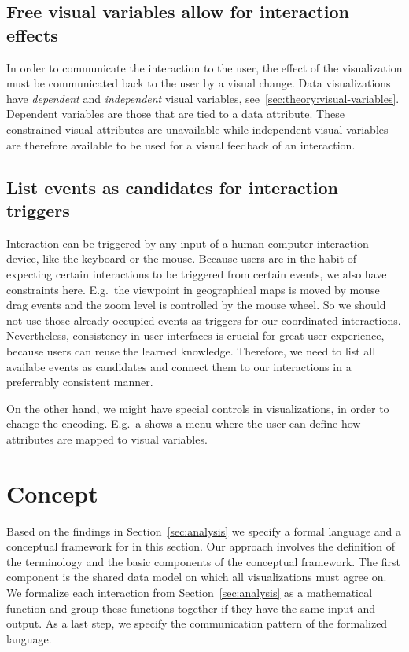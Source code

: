 \begin{bullshit}
\subsection{Free visual variables allow for interaction effects}

In order to communicate the interaction to the user, the effect of the visualization must be communicated back to the user by a visual change.
Data visualizations have \emph{dependent} and \emph{independent} visual variables, see~\ref{sec:theory:visual-variables}.
Dependent variables are those that are tied to a data attribute.
These constrained visual attributes are unavailable while independent visual variables are therefore available to be used for a visual feedback of an interaction.

\subsection{List events as candidates for interaction triggers}

Interaction can be triggered by any input of a human-computer-interaction device, like the keyboard or the mouse.
Because users are in the habit of expecting certain interactions to be triggered from certain events, we also have constraints here.
E.g.\ the viewpoint in geographical maps is moved by mouse drag events and the zoom level is controlled by the mouse wheel.
So we should not use those already occupied events as triggers for our coordinated interactions.
Nevertheless, consistency in user interfaces is crucial for great user experience, because users can reuse the learned knowledge.
Therefore, we need to list all availabe events as candidates and connect them to our interactions in a preferrably consistent manner.

On the other hand, we might have special controls in visualizations, in order to change the encoding.
E.g.\ a \tmap{} shows a menu where the user can define how attributes are mapped to visual variables.
\end{bullshit}


\clearpage
\section{Concept}\label{sec:concept}
Based on the findings in Section~\ref{sec:analysis} we specify a formal language and a conceptual framework for \cmvs{} in this section.
Our approach involves the definition of the terminology and the basic components of the conceptual framework.
The first component is the shared data model on which all visualizations must agree on.
We formalize each interaction from Section~\ref{sec:analysis} as a mathematical function and group these functions together if they have the same input and output.
As a last step, we specify the communication pattern of the formalized language.

